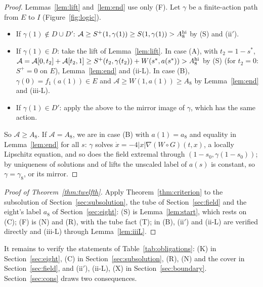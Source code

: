 \documentclass[11pt]{article}
\theoremstyle{definition}
\begin{document}
\begin{proof}
Lemmas~\ref{lem:lift} and~\ref{lem:end} use only (F). Let $\gamma$ be a finite-action path from $E$ to $I$
(Figure~\ref{fig:logic}).
\begin{itemize}
\item If $\gamma(1)\notin D\cup D'$: $\mathcal A\ge S^+(1,\gamma(1))\ge S(1,\gamma(1))>A_8^{\rm hi}$ by (S) and (ii$'$).
\item If $\gamma(1)\in D$: take the lift of Lemma~\ref{lem:lift}. In case (A), with $t_2=1-s^*$,
$\mathcal A=\mathcal A[0,t_2]+\mathcal A[t_2,1]\ge S^+(t_2,\gamma(t_2))+W(s^*,a(s^*))>A_8^{\rm hi}$ by (S) (for $t_2=0$:
$S^+=0$ on $E$), Lemma~\ref{lem:end} and (ii-L). In case (B), $\gamma(0)=f_1(a(1))\in E$ and
$\mathcal A\ge W(1,a(1))\ge A_8$ by Lemma~\ref{lem:end} and (iii-L).
\item If $\gamma(1)\in D'$: apply the above to the mirror image of $\gamma$, which has the same action.
\end{itemize}
So $\mathcal A\ge A_8$. If $\mathcal A=A_8$, we are in case (B) with $a(1)=a_8$ and equality in Lemma~\ref{lem:end} for
all $s$: $\gamma$ solves $\dot x=-4|x|\nabla(W\circ G)(t,x)$, a locally Lipschitz equation, and so does the field extremal
through $(1-s_0,\gamma(1-s_0))$; by uniqueness of solutions and of lifts the unscaled label of $a(s)$ is constant, so
$\gamma=\gamma_8$, or its mirror.
\end{proof}

\begin{proof}[Proof of Theorem~\ref{thm:twelfth}]
Apply Theorem~\ref{thm:criterion} to the subsolution of Section~\ref{sec:subsolution}, the tube of
Section~\ref{sec:field} and the eight's label $a_8$ of Section~\ref{sec:eight}: (S) is Lemma~\ref{lem:start}, which
rests on (C); (F) is (N) and (R), with the tube fact (T); in (B), (ii$'$) and (ii-L) are verified directly and (iii-L)
through Lemma~\ref{lem:iiiL}.
\end{proof}
It remains to verify the statements of Table~\ref{tab:obligations}: (K) in Section~\ref{sec:eight}, (C) in
Section~\ref{sec:subsolution}, (R), (N) and the cover in Section~\ref{sec:field}, and (ii$'$), (ii-L), (X) in
Section~\ref{sec:boundary}. Section~\ref{sec:cons} draws two consequences.
\end{document}
